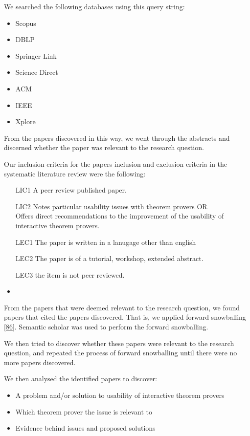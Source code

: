 \documentclass[
]{article}
\providecommand{\tightlist}{%
  \setlength{\itemsep}{0pt}\setlength{\parskip}{0pt}}
\begin{document}
We searched the following databases using this query string:

\begin{itemize}
\tightlist
\item
  Scopus
\item
  DBLP
\item
  Springer Link
\item
  Science Direct
\item
  ACM
\item
  IEEE
\item
  Xplore
\end{itemize}

From the papers discovered in this way, we went through the abstracts
and discerned whether the paper was relevant to the research question.

Our inclusion criteria for the papers inclusion and exclusion criteria
in the systematic literature review were the following:

\begin{itemize}
\tightlist
\item[LIC1]
  A peer review published paper.
\item[LIC2]
  Notes particular usability issues with theorem provers OR\\
  Offers direct recommendations to the improvement of the usability of
  interactive theorem provers.
\item[LEC1]
  The paper is written in a lanugage other than english
\item[LEC2]
  The paper is of a tutorial, workshop, extended abstract.
\item[LEC3] the item is not peer reviewed.

\item
\end{itemize}

From the papers that were deemed relevant to the research question, we
found papers that cited the papers discovered. That is, we applied
forward snowballing {[}\protect\hyperlink{ref-Snowballing}{86}{]}.
Semantic scholar was used to perform the forward snowballing.

We then tried to discover whether these papers were relevant to the
research question, and repeated the process of forward snowballing until
there were no more papers discovered.

We then analysed the identified papers to discover:

\begin{itemize}
\tightlist
\item
  A problem and/or solution to usability of interactive theorem provers
\item
  Which theorem prover the issue is relevant to
\item
  Evidence behind issues and proposed solutions
\end{itemize}
\end{document}
